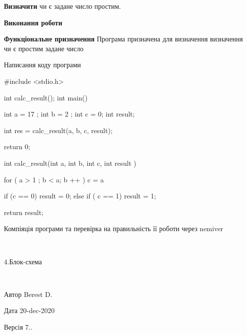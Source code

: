 
\begin{DoxyEnumerate}
\item {\bfseries{Визначити}} чи є задане число простим.
\end{DoxyEnumerate}

{\bfseries{Виконання роботи}}
\begin{DoxyEnumerate}
\item {\bfseries{Функціональне призначення}} Програма призначена для визначення визначення чи є простим задане число
\item Написання коду програми \begin{DoxyVerb} #include <stdio.h>

 int calc_result();
 int main()
 {   
 int a = 17 ;
 int b = 2 ; 
 int c = 0;
 int result;


 int res = calc_result(a, b, c, result);


 return 0;
 }

 int calc_result(int a, int b, int c, int result ) {

   for ( a > 1 ;  b < a; b ++ ) {
        c = a %
       }

        if (c == 0) {
          result = 0;
         } else if ( c == 1){
            result = 1;
             }

     return result;
     }
\end{DoxyVerb}

\item Компіяція програми та перевірка на правильність її роботи через nemiver
\end{DoxyEnumerate}

 ~\newline


4.Блок-\/схема

 ~\newline


\begin{DoxyAuthor}{Автор}
Berest D. 
\end{DoxyAuthor}
\begin{DoxyDate}{Дата}
20-\/dec-\/2020 
\end{DoxyDate}
\begin{DoxyVersion}{Версія}
7.. 
\end{DoxyVersion}
